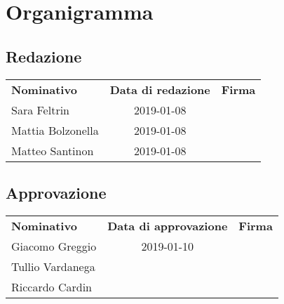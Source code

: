 \section{Organigramma}

\subsection{Redazione}
\begin{table}[H]
	\centering\renewcommand{\arraystretch}{1.5}
	
    \begin{tabular}{l c c}
		
		
		\rowcolorhead 
		{ \textbf{Nominativo}} &
		{ \textbf{Data di redazione}} &
		{ \textbf{Firma}}  \\ 
		
		\rowcolorlight
		Sara Feltrin & 2019-01-08 &   \\ 
		\rowcolordark
		Mattia Bolzonella & 2019-01-08 &   \\ 
		\rowcolorlight
		Matteo Santinon & 2019-01-08 &   \\ 
	\end{tabular}
\end{table}

\subsection{Approvazione}
\begin{table}[H]
	\centering\renewcommand{\arraystretch}{1.5}
	
	\begin{tabular}{l c c}
		
		
		\rowcolorhead 
		{ \textbf{Nominativo}} &
		{ \textbf{Data di approvazione}} &
		{ \textbf{Firma}}  \\
		
		\rowcolorlight
		Giacomo Greggio & 2019-01-10 &   \\ 
		\rowcolordark
		Tullio Vardanega &  &   \\ 
		\rowcolorlight
		Riccardo Cardin &  &   \\ 
	\end{tabular}
\end{table}

